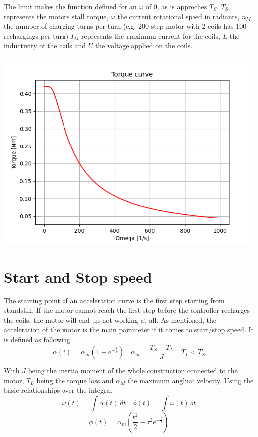 \documentclass{article}
\begin{document}
    The limit makes the function defined for an $\omega$ of 0, as is approches $T_S$. $T_S$ represents the motors stall torque, 
    $\omega$ the current rotational speed in radiants, $n_M$ the number of charging turns per turn (e.g. 200 step motor with 2 coils has 100 rechargings per turn)
    $I_M$ represents the maximum current for the coils, $L$ the inductivity of the coils and $U$ the voltage applied on the coils.

    \begin{center}
        \includegraphics[scale=0.5]{../test/Torque_Curve.png}
    \end{center}
    
\section{Start and Stop speed}

    The starting point of an acceleration curve is the first step starting from standstill. If the motor cannot reach the first step before the controller recharges the coils, 
    the motor will end up not working at all. As mentioned, the acceleration of the motor is the main parameter if it comes to start/stop speed. It is defined as following
    \begin{equation}
        \alpha(t) = \alpha_m (1 - e^{-\frac{t}{\tau}}) \quad \alpha_m = \frac{T_S - T_L}{J} \quad T_L < T_S
    \end{equation}

    With $J$ being the inertia moment of the whole construction connected to the motor, $T_L$ being the torque loss and $\alpha_M$ the maximum angluar velocity.
    Using the basic relationships over the integral
    \[
        \omega(t) = \int \alpha(t) \, dt \quad \phi(t) = \int \omega(t) \, dt
    \]
    \begin{equation}
        \phi(t) = \alpha_m (\frac{t^2}{2} - \tau^2 e^{-\frac{t}{\tau}})
    \end{equation}
\end{document}
